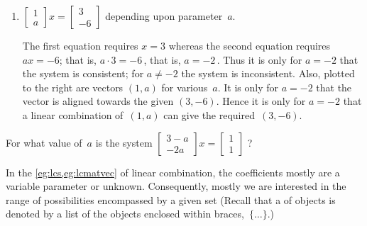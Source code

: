 \begin{example}
\begin{enumerate}
\item 
\begin{figbox}{}%
\(\begin{bmatrix} 1\\a \end{bmatrix}x
=\begin{bmatrix} 3\\-6 \end{bmatrix}\) depending upon parameter~\(a\).
\begin{solution} 
The first equation requires \(x=3\) whereas the second equation requires \(ax=-6\); that is, \(a\cdot3=-6\)\,, that is, \(a=-2\)\,.
Thus it is only for \(a=-2\) that the system is consistent;
for \(a\neq-2\) the system is inconsistent.
Also, plotted to the right are vectors \((1,a)\) for various~\(a\).
It is only for \(a=-2\) that the vector is aligned towards the given \((3,-6)\).
Hence it is only for \(a=-2\) that a linear combination of~\((1,a)\) can give the required~\((3,-6)\).
\aqed

\end{solution}
\end{figbox}

\end{enumerate}
\end{example}




\begin{activity}
For what value of~\(a\) is the system \(\begin{bmatrix} 3-a\\-2a \end{bmatrix}x=\begin{bmatrix} 1\\1 \end{bmatrix}\) ?
\end{activity}



In the \cref{eg:lcs,eg:lcmatvec} of linear combination, the coefficients mostly are a variable parameter or unknown.
Consequently, mostly we are interested in the range of possibilities encompassed by a given set 
(Recall that a  of objects is denoted by a list of the objects enclosed within braces,~\(\{\ldots\}\).)


